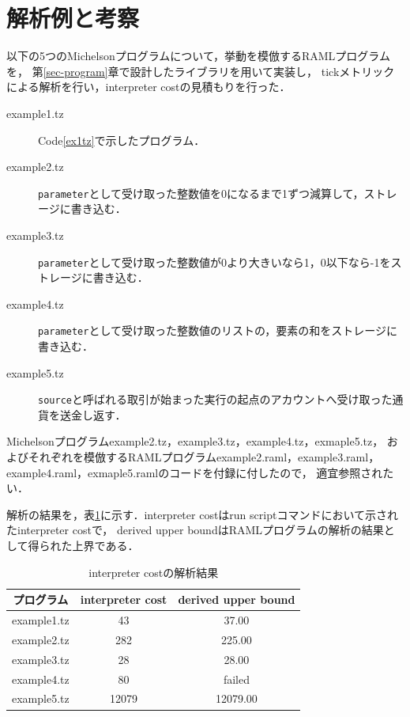 \documentclass{kuisthesis}
\begin{document}
\section{解析例と考察}
以下の5つのMichelsonプログラムについて，挙動を模倣するRAMLプログラムを，
第\ref{sec-program}章で設計したライブラリを用いて実装し，
tickメトリックによる解析を行い，interpreter costの見積もりを行った．
\\
\begin{description}
  \item [example1.tz] Code\ref{ex1tz}で示したプログラム．
  \item [example2.tz] {\tt parameter}として受け取った整数値を0になるまで1ずつ減算して，ストレージに書き込む．
  \item [example3.tz] {\tt parameter}として受け取った整数値が0より大きいなら1，0以下なら-1をストレージに書き込む．
  \item [example4.tz] {\tt parameter}として受け取った整数値のリストの，要素の和をストレージに書き込む．
  \item [example5.tz] {\tt source}と呼ばれる取引が始まった実行の起点のアカウントへ受け取った通貨を送金し返す．\\
\end{description}

Michelsonプログラムexample2.tz，example3.tz，example4.tz，exmaple5.tz，
およびそれぞれを模倣するRAMLプログラムexample2.raml，example3.raml，example4.raml，exmaple5.ramlのコードを付録に付したので，
適宜参照されたい．

解析の結果を，表\ref{table1}に示す．interpreter costはrun scriptコマンドにおいて示されたinterpreter costで，
derived upper boundはRAMLプログラムの解析の結果として得られた上界である．

\begin{table}[htb]
  \begin{center}
    \caption{interpreter costの解析結果}
    \begin{tabular}{|c|c|c|} \hline
      プログラム & interpreter cost & derived upper bound \\ \hline \hline
      example1.tz & 43 & 37.00 \\ \hline
      example2.tz & 282 & 225.00 \\ \hline
      example3.tz & 28 & 28.00 \\ \hline
      example4.tz & 80 & failed \\ \hline
      example5.tz & 12079 & 12079.00 \\ \hline
    \end{tabular}
    \label{table1}
  \end{center}
\end{table}
\end{document}
